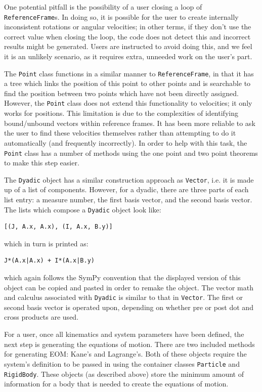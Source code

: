 \documentclass[twocolumn,10pt,final]{asme2e}
\begin{document}
One potential pitfall is the possibility of a user closing a loop of
\verb|ReferenceFrame|s.
In doing so, it is possible for the user to create internally inconsistent
rotations or angular velocities; in other terms, if they don't use the correct
value when closing the loop, the code does not detect this and incorrect
results might be generated.
Users are instructed to avoid doing this, and we feel it is an unlikely
scenario, as it requires extra, unneeded work on the user's part.

The \verb|Point| class functions in a similar manner to \verb|ReferenceFrame|,
in that it has a tree which links the position of this point to other points
and is searchable to find the position between two points which have not been
directly assigned.
However, the \verb|Point| class does not extend this functionality to
velocities; it only works for positions.
This limitation is due to the complexities of identifying bound/unbound vectors within
reference frames.
It has been more reliable to ask the user to find these velocities themselves
rather than attempting to do it automatically (and frequently incorrectly).
In order to help with this task, the \verb|Point| class has a number of methods
using the one point and two point theorems \cite{Kane1985} to make this step
easier.

The \verb|Dyadic| object has a similar construction approach as \verb|Vector|,
i.e. it is made up of a list of components.
However, for a dyadic, there are three parts of each list entry: a measure number,
the first basis vector, and the second basis vector.
The lists which compose a \verb|Dyadic| object look like:
\begin{verbatim}
[(J, A.x, A.x), (I, A.x, B.y)]
\end{verbatim}
which in turn is printed as:
\begin{verbatim}
J*(A.x|A.x) + I*(A.x|B.y)
\end{verbatim}
which again follows the SymPy convention that the displayed version of this
object can be copied and pasted in order to remake the object.
The vector math and calculus associated with \verb|Dyadic| is similar to that
in \verb|Vector|. The first or second basis vector is operated upon, depending
on whether pre or post dot and cross products are used.

For a user, once all kinematics and system parameters have been defined, the
next step is generating the equations of motion.
There are two included methods for generating EOM: Kane's and Lagrange's.
Both of these objects require the system's definition to be passed in using the
container classes \verb|Particle| and \verb|RigidBody|.
These objects (as described above) store the minimum amount of information for
a body that is needed to create the equations of motion.
\end{document}
